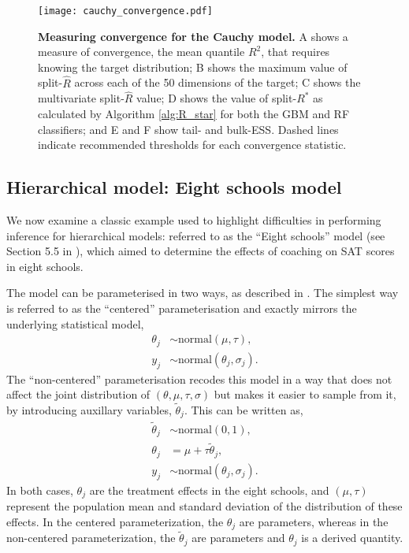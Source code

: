 \documentclass{article}
\begin{document}
\begin{figure}[!htb]
	\centerline{\texttt{[image: cauchy\_convergence.pdf]}}
	\caption{\textbf{Measuring convergence for the Cauchy model.} A shows a measure of convergence, the mean quantile $R^2$, that requires knowing the target distribution; B shows the maximum value of split-$\widehat{R}$ across each of the 50 dimensions of the target; C shows the multivariate split-$\widehat{R}$ value; D shows the value of split-$R^*$ as calculated by Algorithm \ref{alg:R_star} for both the GBM and RF classifiers; and E and F show tail- and bulk-ESS. Dashed lines indicate recommended thresholds for each convergence statistic.}
	\label{fig:cauchy_convergence}
\end{figure}

\subsection{Hierarchical model: Eight schools model}\label{sec:eight_shools}
We now examine a classic example used to highlight difficulties in performing inference for hierarchical models: referred to as the ``Eight schools'' model (see Section 5.5 in \cite{gelman2013bayesian}), which aimed to determine the effects of coaching on SAT scores in eight schools. 

The model can be parameterised in two ways, as described in \cite{vehtari2019rank}. The simplest way is referred to as the ``centered'' parameterisation and exactly mirrors the underlying statistical model,
%
\begin{align*}
\theta_j &\sim \text{normal}(\mu, \tau), \\
y_j &\sim \text{normal}(\theta_j, \sigma_j).
\end{align*}
%
The ``non-centered'' parameterisation recodes this model in a way that does not affect the joint distribution of $(\theta, \mu, \tau, \sigma)$ but makes it easier to sample from it, by introducing auxillary variables, $\tilde \theta_j$. This can be written as,
%
\begin{align*}
\tilde{\theta}_j &\sim \text{normal}(0, 1), \\
\theta_j &= \mu + \tau \tilde{\theta}_j,\\
y_j &\sim \text{normal}(\theta_j, \sigma_j).
\end{align*}
%
In both cases, $\theta_j$ are the treatment effects in the eight schools, and $(\mu, \tau)$ represent the population mean and standard deviation 
of the distribution of these effects. In the centered parameterization, the $\theta_j$ are parameters, whereas in the non-centered parameterization, the $\tilde{\theta}_j$ are parameters and $\theta_j$ is a derived quantity.
\end{document}

